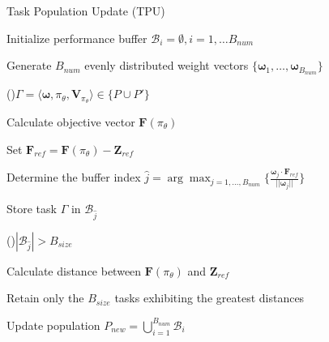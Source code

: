 \documentclass[10pt,journal,compsoc]{IEEEtran}
\begin{document}
\begin{algorithm}[t]
    \caption{Task Population Update (TPU)}
    \label{alg:TPU}

    Initialize performance buffer $\mathcal{B}_i = \emptyset, i = 1, \dots B_{num}$\;

    Generate $B_{num}$ evenly distributed weight vectors $\{ \boldsymbol{\omega}_1, \dots, \boldsymbol{\omega}_{B_{num}} \}$\;

    \For(){$\Gamma = \langle \boldsymbol{\omega}, \pi_{\theta}, \boldsymbol{V}_{\pi_{\theta}} \rangle \in \{ P \cup P' \}$} {

        Calculate objective vector $\boldsymbol{F}(\pi_{\theta})$\;

        Set $\boldsymbol{F}_{ref} = \boldsymbol{F}(\pi_{\theta}) - \boldsymbol{Z}_{ref}$\;

        Determine the buffer index $\hat{j} = \arg \max_{j = 1, \dots, B_{num}} \{ \frac{\boldsymbol{\omega}_j \cdot \boldsymbol{F}_{ref}}{||\boldsymbol{\omega}_j||} \}$\;

        Store task $\Gamma$ in $\mathcal{B}_{\hat{j}}$\;

        \If(){$|\mathcal{B}_{\hat{j}}| > B_{size}$} {
            Calculate distance between $\boldsymbol{F}(\pi_{\theta})$ and $\boldsymbol{Z}_{ref}$\;

            Retain only the $B_{size}$ tasks exhibiting the greatest distances\;
        }
        
    }

    Update population $P_{new} = \bigcup_{i=1}^{B_{num}} \mathcal{B}_i$\;
    
\end{algorithm}

\end{document}
